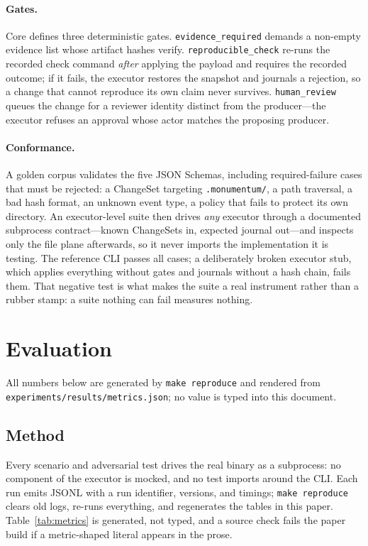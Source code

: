 \documentclass[10pt,twocolumn]{article}
\begin{document}
\paragraph{Gates.} Core defines three deterministic gates.
\texttt{evidence\_required} demands a non-empty evidence list whose
artifact hashes verify. \texttt{reproducible\_check} re-runs the recorded
check command \emph{after} applying the payload and requires the recorded
outcome; if it fails, the executor restores the snapshot and journals a
rejection, so a change that cannot reproduce its own claim never survives.
\texttt{human\_review} queues the change for a reviewer identity distinct
from the producer---the executor refuses an approval whose actor matches
the proposing producer.

\paragraph{Conformance.} A golden corpus validates the five JSON Schemas,
including required-failure cases that must be rejected: a ChangeSet
targeting \texttt{.monumentum/}, a path traversal, a bad hash format, an unknown
event type, a policy that fails to protect its own directory. An
executor-level suite then drives \emph{any} executor through a documented
subprocess contract---known ChangeSets in, expected journal out---and
inspects only the file plane afterwards, so it never imports the
implementation it is testing. The reference CLI passes all cases; a
deliberately broken executor stub, which applies everything without gates
and journals without a hash chain, fails them. That negative test is what
makes the suite a real instrument rather than a rubber stamp: a suite
nothing can fail measures nothing.

\section{Evaluation}
\label{sec:eval}
All numbers below are generated by \texttt{make reproduce} and rendered
from \texttt{experiments/results/metrics.json}; no value is typed into this
document.

\begin{table}[t]
\centering
\small

\caption{Headline metrics. Every value is regenerated from run logs; the
source run identifies the log under \texttt{experiments/*/logs/}.}
\label{tab:metrics}
\end{table}

\subsection{Method}
Every scenario and adversarial test drives the real binary as a
subprocess: no component of the executor is mocked, and no test imports
around the CLI. Each run emits JSONL with a run identifier, versions, and
timings; \texttt{make reproduce} clears old logs, re-runs everything, and
regenerates the tables in this paper. Table~\ref{tab:metrics} is generated,
not typed, and a source check fails the paper build if a metric-shaped
literal appears in the prose.
\end{document}
